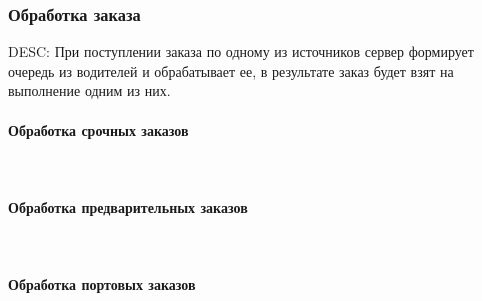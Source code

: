 \subsubsection{Обработка заказа} \label{selection_drivers_for_the_order}

    DESC:  При поступлении заказа по одному из источников сервер формирует очередь из водителей и обрабатывает ее, в результате заказ будет взят на выполнение одним из них. 

    \paragraph{Обработка срочных заказов} \mbox{} \\ \label{}

    \paragraph{Обработка предварительных заказов} \mbox{} \\ \label{}

    \paragraph{Обработка портовых заказов} \mbox{} \\ \label{}